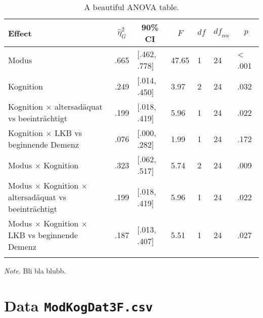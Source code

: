 \documentclass[
  doc,floatsintext]{apa6}
\begin{document}
\begin{table}[tbp]

\begin{center}
\begin{threeparttable}

\caption{\label{tab:tabanovaext}A beautiful ANOVA table.}

\begin{tabular}{lllllll}
\toprule
Effect & \multicolumn{1}{c}{$\hat{\eta}^2_G$} & \multicolumn{1}{c}{90\% CI} & \multicolumn{1}{c}{$F$} & \multicolumn{1}{c}{$\mathit{df}$} & \multicolumn{1}{c}{$\mathit{df}_{\mathrm{res}}$} & \multicolumn{1}{c}{$p$}\\
\midrule
Modus & .665 & {}[.462, .778] & 47.65 & 1 & 24 & < .001\\
Kognition & .249 & {}[.014, .450] & 3.97 & 2 & 24 & .032\\
Kognition $\times$  altersadäquat vs beeinträchtigt & .199 & {}[.018, .419] & 5.96 & 1 & 24 & .022\\
Kognition $\times$  LKB vs beginnende Demenz & .076 & {}[.000, .282] & 1.99 & 1 & 24 & .172\\
Modus $\times$ Kognition & .323 & {}[.062, .517] & 5.74 & 2 & 24 & .009\\
Modus $\times$ Kognition $\times$  altersadäquat vs beeinträchtigt & .199 & {}[.018, .419] & 5.96 & 1 & 24 & .022\\
Modus $\times$ Kognition $\times$  LKB vs beginnende Demenz & .187 & {}[.013, .407] & 5.51 & 1 & 24 & .027\\
\bottomrule
\addlinespace
\end{tabular}

\begin{tablenotes}[para]
\normalsize{\textit{Note.} Bli bla blubb.}
\end{tablenotes}

\end{threeparttable}
\end{center}

\end{table}

\hypertarget{data-modkogdat3f.csv}{%
\section{\texorpdfstring{Data \texttt{ModKogDat3F.csv}}{Data ModKogDat3F.csv}}\label{data-modkogdat3f.csv}}
\end{document}
